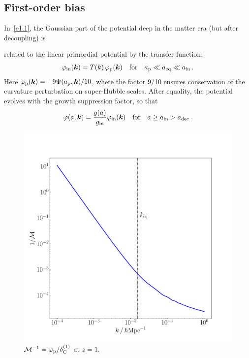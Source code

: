 \subsection{First-order bias}
%
In~\eqref{e1.1}, the Gaussian part of the potential deep in the matter era {(but after decoupling)} is {related to the linear primordial potential by the transfer function:
\begin{equation} \label{vpe}
\varphi_{{\mathrm{in}}}(\bm {k})=T(k)\,\varphi_{\mathrm{p}}(\bm {k}) {\quad \mbox{for}\quad a_{\mathrm{p}}\ll a_{\mathrm{eq}} \ll a_{{\mathrm{in}}} \,. }
\end{equation}
{Here $\varphi_{\mathrm{p}}(\bm {k})=-9
\Psi(a_{\mathrm{p}},\bm {k})/10$, where  the factor 9/10 ensures conservation of the curvature perturbation on super-Hubble scales.}
After equality, the potential evolves with the growth suppression factor, so that
\begin{equation}\label{pottp}
{\varphi(a,\bm {k}) = \frac{g(a)}{g_{{\mathrm{in}}}}  \varphi_{{\mathrm{in}}}(\bm {k}) \quad \mbox{for}\quad a\geq a_{{\mathrm{in}}}> {a_{\mathrm{dec}}}\,.}
\end{equation}
\begin{figure}[ht]
\centering
\includegraphics[width=.49\textwidth, angle=0]{fig/Mplot.pdf}
\caption{{${\cal M}^{-1}= \varphi_{\mathrm{p}}/\delta^{(1)}_{\mathrm{C}}$ at $z=1$.}}
\label{mplot}
\end{figure}

}
